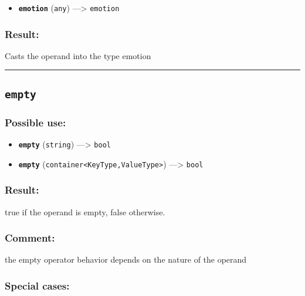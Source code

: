 \documentclass[]{book}
\providecommand{\tightlist}{%
  \setlength{\itemsep}{0pt}\setlength{\parskip}{0pt}}
\theoremstyle{definition}
\theoremstyle{definition}
\theoremstyle{definition}
\theoremstyle{remark}
\begin{document}
\begin{itemize}
\tightlist
\item
  \textbf{\texttt{emotion}} (\texttt{any}) ---\textgreater{}
  \texttt{emotion}
\end{itemize}

\subsubsection{Result:}\label{result-145}

Casts the operand into the type emotion

\begin{center}\rule{0.5\linewidth}{\linethickness}\end{center}

\subsection{\texorpdfstring{\texttt{empty}}{empty}}\label{empty}

\subsubsection{Possible use:}\label{possible-use-152}

\begin{itemize}
\tightlist
\item
  \textbf{\texttt{empty}} (\texttt{string}) ---\textgreater{}
  \texttt{bool}
\item
  \textbf{\texttt{empty}}
  (\texttt{container\textless{}KeyType,ValueType\textgreater{}})
  ---\textgreater{} \texttt{bool}
\end{itemize}

\subsubsection{Result:}\label{result-146}

true if the operand is empty, false otherwise.

\subsubsection{Comment:}\label{comment-32}

the empty operator behavior depends on the nature of the operand

\subsubsection{Special cases:}\label{special-cases-55}
\end{document}
